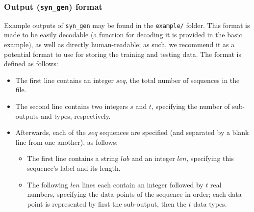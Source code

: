 \documentclass[12pt]{article}
\begin{document}
	\subsubsection{Output ({\tt syn\_gen}) format}
	Example outputs of {\tt syn\_gen} may be found in the {\tt example/} folder. This format is made to be easily decodable (a function for decoding it is provided in the basic example), as well as directly human-readable; as such, we recommend it as a potential format to use for storing the training and testing data. The format is defined as follows:
	\begin{itemize}
		\item The first line contains an integer $seq$, the total number of sequences in the file.
		\item The second line contains two integers $s$ and $t$, specifying the number of sub-outputs and types, respectively.
		\item Afterwards, each of the $seq$ sequences are specified (and separated by a blank line from one another), as follows:
		\begin{itemize}
			\item The first line contains a string $lab$ and an integer $len$, specifying this sequence's label and its length.
			\item The following $len$ lines each contain an integer followed by $t$ real numbers, specifying the data points of the sequence in order; each data point is represented by first the sub-output, then the $t$ data types.
		\end{itemize}
	\end{itemize}
\end{document}
